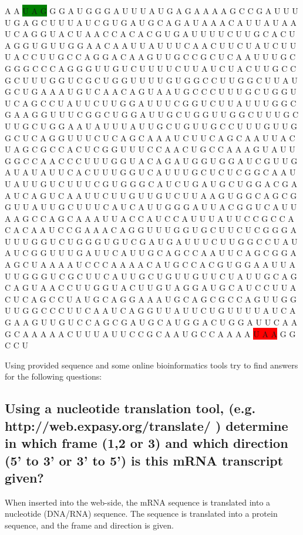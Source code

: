 A A \colorbox{green}{U A G} G G A U G G G A U U U A U G A G A A A A G C C G A U U U U G A G C U U U A U C G U G A U G C A G A U A A A C A U U A U A A U C A G G U A C U A A C C A C A C G U G A U U U U C U U G C A C U A G G U G U U G G A A C A A U U A U U U C A A C U U C U A U C U U U A C C U U G C C A G G A C A A G U U G C C G C U C A A U U U G C G G G C C C A G G G U U G U C U U U U C U U A U C U A C U U G C C G C U U U G G U C G C U G G U U U U G U G G C C U U G G C U U A U G C U G A A A U G U C A A C A G U A A U G C C C U U U G C U G G U U C A G C C U A U U C U U G G A U U U C G G U C U U A U U U G G C G A A G G U U U C G G C U G G A U U G C U G G U U G G C U U U G C U U G C U G G A A U A U U U A U U G C U G U U G C C U U U G U U G G C U C A G G U U U C U C A G C A A A U C U U C A G C A A U U A C U A G C G C C A C U C G G U U U C C A A C U G C C A A A G U A U U G G C C A A C C C U U U G G U A C A G A U G G U G G A U C G U U G A U A U A U U C A C U U U G G U C A U U U G C U C U C G G C A A U U A U U G U C U U U C G U G G G C A U C U G A U G C U G G A C G A A U C A G U C A A U U C U U G U U G U C U U A A G U G G C A G C G G U U A U U G C U U U C A U C A U U G G G A U U A C G G U C A U U A A G C C A G C A A A U U A C C A U C C A U U U A U U C C G C C A C A C A A U C C G A A A C A G G U U U G G U G C U U C U C G G G A U U U G G U C U G G G U G U C G A U G A U U U C U U G G C C U A U A U C G G U U U G A U U C A U U G C A G C C A A U U C A G C G G A A G C U A A A A U C C C A A A A C A U G C C A C G U G G A A U U A U U G G G U C G C U U C A U U G C U G U U G U U C U A U U G C A G C A G U A A C C U U G G U A C U U G U A G G A U G C A U C C U U A C U C A G C C U A U G C A G G A A A U G C A G C G C C A G U U G G U U G G C C C U U C A A U C A G G U U A U U C U G U U U U A U C A G A A G U U G U C C A G C G A U G C A U G G A C U G G A U U C A A G C A A A A A C U U U A U U C C G C A A U G C C A A A A \colorbox{red}{U A A} G G C C U


\vspace*{1em}
Using provided sequence and some online bioinformatics tools try to find answers for the following questions:

\subsection*{Using a nucleotide translation tool, (e.g. http://web.expasy.org/translate/ ) determine in which frame (1,2 or 3) and which direction (5' to 3' or 3' to 5') is this mRNA transcript given?}
When inserted into the web-side, the mRNA sequence is translated into a nucleotide (DNA/RNA) sequence. The sequence is translated into a protein sequence, and the frame and direction is given. 


